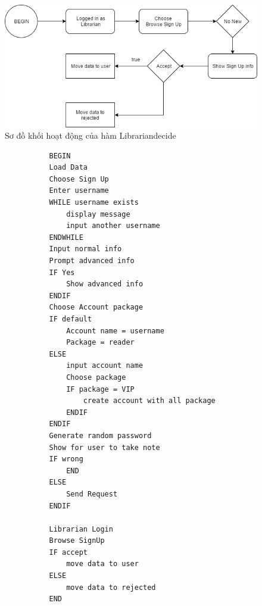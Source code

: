 \documentclass[12pt,a4paper]{report}
\begin{document}
\begin{enumerate}
\begin{figure}[H]
                    \label{F:librarian}
                    \includegraphics[scale = .5]{librariandecide.png}
                    \caption{Sơ đồ khối hoạt động của hàm Librariandecide}
                \end{figure}
                \begin{verbatim}
                BEGIN
                Load Data
                Choose Sign Up
                Enter username
                WHILE username exists
                    display message
                    input another username
                ENDWHILE
                Input normal info
                Prompt advanced info
                IF Yes
                    Show advanced info
                ENDIF
                Choose Account package
                IF default
                    Account name = username
                    Package = reader
                ELSE
                    input account name
                    Choose package
                    IF package = VIP
                        create account with all package
                    ENDIF
                ENDIF
                Generate random password
                Show for user to take note
                IF wrong
                    END
                ELSE
                    Send Request
                ENDIF

                Librarian Login
                Browse SignUp
                IF accept
                    move data to user
                ELSE
                    move data to rejected
                END
                \end{verbatim}
            \end{enumerate}
            \newpage
\end{document}
